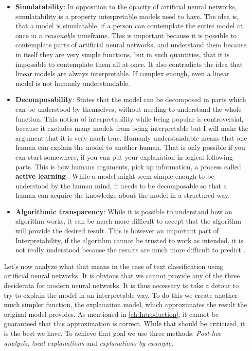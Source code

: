 \begin{itemize}
    \item \textbf{Simulatability}: In opposition to the opacity of artificial neural networks, simulatability is a property interpretable models need to have. The idea is, that a model is simulatable, if a person can contemplate the entire model at once in a \textit{reasonable} timeframe. This is important because it is possible to contemplate parts of artificial neural networks, and understand them because in itself they are very simple functions, but in such quantities, that it is impossible to contemplate them all at once. It also contradicts the idea that linear models are always interpretable. If complex enough, even a linear model is not humanly understandable.
    \item \textbf{Decomposability}: States that the model can be decomposed in parts which can be understood by themselves, without needing to understand the whole function. This notion of interpretability while being popular is controversial, because it excludes many models from being interpretable but I will make the argument that it is very much true. Humanly understandable means that one human can explain the model to another human. That is only possible if you can start somewhere, if you can put your explanation in logical following parts. This is how humans arguments, pick up information, a process called \textbf{active learning} \cite{activeLearning}. While a model might seem simple enough to be understood by the human mind, it needs to be decomposable so that a human can acquire the knowledge about the model in a structured way.
    \item \textbf{Algorithmic transparency}: While it is possible to understand how an algorithm works, it can be much more difficult to accept that the algorithm will provide the desired result. This is however an important part of Interpretability, if the algorithm cannot be trusted to work as intended, it is not really understood because the results are much more difficult to predict \cite{lipton2017mythos}.
\end{itemize}


Let's now analyze what that means in the case of text classification using artificial neural networks. It is obvious that we cannot provide any of the three desiderata for modern neural networks. It is thus necessary to take a detour to try to explain the model in an interpretable way. To do this we create another much simpler function, the explanation model, which approximates the result the original model provides. As mentioned in \autoref{ch:Introduction}, it cannot be guaranteed that this approximation is correct. While that should be criticized, it is the best we have. To achieve that goal we use three methods: \textit{Post-hoc analysis, local explanations} and \textit{explanations by example.}

